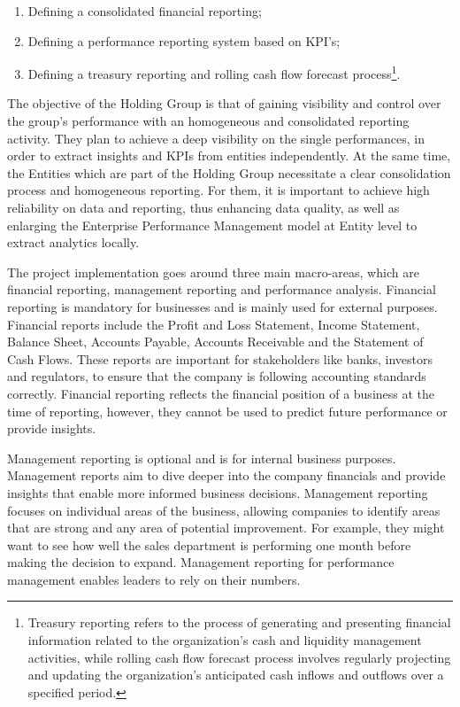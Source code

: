 \documentclass[12pt,a4paper,openright,twoside]{book}
\begin{document}
\begin{enumerate}
    \item Defining a consolidated financial reporting;
    \item Defining a performance reporting system based on KPI’s;
    \item Defining a treasury reporting and rolling cash flow forecast process\footnote{Treasury reporting refers to the process of generating and presenting financial information related to the organization's cash and liquidity management activities, while rolling cash flow forecast process involves regularly projecting and updating the organization's anticipated cash inflows and outflows over a specified period.}.
\end{enumerate}

The objective of the Holding Group is that of gaining visibility and control over the group's performance with an homogeneous and consolidated reporting activity.
%
They plan to achieve a deep visibility on the single performances, in order to extract insights and KPIs from entities independently.
%
At the same time, the Entities which are part of the Holding Group necessitate a clear consolidation process and homogeneous reporting.
%
For them, it is important to achieve high reliability on data and reporting, thus enhancing data quality, as well as enlarging the Enterprise Performance Management model at Entity level to extract analytics locally.

The project implementation goes around three main macro-areas, which are financial reporting, management reporting and performance analysis.
%
Financial reporting is mandatory for businesses and is mainly used for external purposes.
%
Financial reports include the Profit and Loss Statement, Income Statement, Balance Sheet, Accounts Payable, Accounts Receivable and the Statement of Cash Flows.
%
These reports are important for stakeholders like banks, investors and regulators, to ensure that the company is following accounting standards correctly.
%
Financial reporting reflects the financial position of a business at the time of reporting, however, they cannot be used to predict future performance or provide insights.

Management reporting is optional and is for internal business purposes. 
%
Management reports aim to dive deeper into the company financials and provide insights that enable more informed business decisions. 
%
Management reporting focuses on individual areas of the business, allowing companies to identify areas that are strong and any area of potential improvement. 
%
For example, they might want to see how well the sales department is performing one month before making the decision to expand. Management reporting for performance management enables leaders to rely on their numbers.
\end{document}
